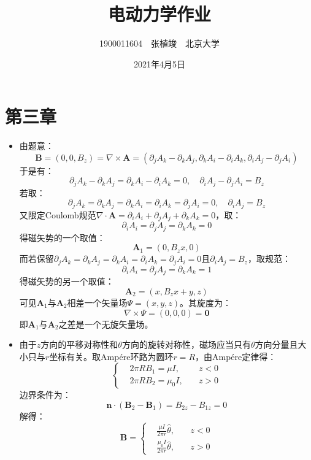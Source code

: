 \documentclass[a4paper,fontset=none]{ctexart}
\begin{document}
    \title{\textbf{电动力学作业}}
    \author{1900011604\ \ 张植竣\ \ 北京大学}
    \date{2021年4月5日}
    \maketitle

    \section*{第三章}

    \begin{itemize}

    \item[1.]
    由题意：
    \[
    \bm{B} = (0,0,B_z) = \nabla\times\bm{A} = (\partial_j A_k - \partial_k A_j, \partial_k A_i - \partial_i A_k, \partial_i A_j - \partial_j A_i)
    \]
    于是有：
    \[
    \partial_j A_k - \partial_k A_j = \partial_k A_i - \partial_i A_k = 0,\quad \partial_i A_j - \partial_j A_i = B_z
    \]
    若取：
    \[
    \partial_j A_k = \partial_k A_j = \partial_k A_i = \partial_i A_k = \partial_j A_i = 0,\quad \partial_i A_j = B_z
    \]
    又限定Coulomb规范$\nabla\cdot\bm{A}=\partial_i A_i+\partial_j A_j+\partial_k A_k=0$，取：
    \[
    \partial_i A_i = \partial_j A_j = \partial_k A_k = 0
    \]
    得磁矢势的一个取值：
    \[
    \bm{A}_1 = (0,B_z x,0)
    \]
    而若保留$\partial_j A_k=\partial_k A_j=\partial_k A_i=\partial_i A_k=\partial_j A_i=0$且$\partial_i A_j = B_z$，取规范：
    \[
    \partial_i A_i = \partial_j A_j = \partial_k A_k = 1
    \]
    得磁矢势的另一个取值：
    \[
    \bm{A}_2 = (x,B_z x + y,z)
    \]
    可见$\bm{A}_1$与$\bm{A}_2$相差一个矢量场$\bm{\varPsi}=(x,y,z)$。其旋度为：
    \[
    \nabla\times\bm{\varPsi} = (0,0,0) = \bm{0}
    \]
    即$\bm{A}_1$与$\bm{A}_2$之差是一个无旋矢量场。

    \item[3.(1)]
    由于$z$方向的平移对称性和$\theta$方向的旋转对称性，磁场应当只有$\theta$方向分量且大小只与$r$坐标有关。取Amp\'{e}re环路为圆环$r=R$，由Amp\'{e}re定律得：
    \[
    \left\{
        \begin{aligned}
            &2\pi RB_1=\mu I,\quad &z<0 \\
            &2\pi RB_2=\mu_0I,\quad &z>0
        \end{aligned}
    \right.
    \]
    边界条件为：
    \[
    \bm{n}\cdot(\bm{B}_2-\bm{B}_1) = B_{2z} - B_{1z} = 0
    \]
    解得：
    \[
    \bm{B} =
    \left\{
        \begin{aligned}
            &\frac{\mu I}{2\pi r}\hat{\theta},\quad &z<0 \\
            &\frac{\mu_0I}{2\pi r}\hat{\theta},\quad &z>0
        \end{aligned}
    \right.
    \]


\end{itemize}
\end{document}
